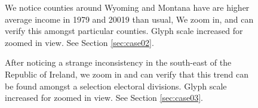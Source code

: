 \begin{figure}[t]
\caption{We notice counties around Wyoming and Montana have are higher average income in 1979 and 20019 than usual, We zoom in, and can verify this amongst particular counties. Glyph scale increased for zoomed in view. See Section \ref{sec:case02}.} \label{fig:case02}
\end{figure}
\begin{figure}[t]
\caption{After noticing a strange inconsistency in the south-east of the Republic of Ireland, we zoom in and can verify that this trend can be found amongst a selection electoral divisions. Glyph scale increased for zoomed in view. See Section \ref{sec:case03}.} \label{fig:case03}
\end{figure}
